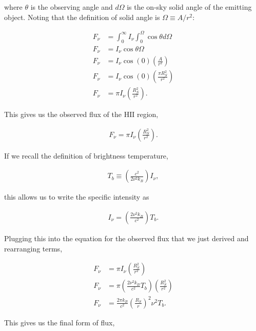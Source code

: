 \documentclass[12pt]{article}
\begin{document}
{\noindent}where $\theta$ is the observing angle and $d\Omega$ is the on-sky solid angle of the emitting object. Noting that the definition of solid angle is $\Omega \equiv A/r^2$:

\begin{equation*}
\begin{split}
    F_\nu &= \int_0^\infty I_\nu \int_0^\Omega \cos \theta d\Omega \\
    F_\nu &= I_\nu \cos \theta \Omega \\
    F_\nu &= I_\nu \cos(0) \left(\frac{A}{r^2}\right) \\
    F_\nu &= I_\nu \cos(0) \left(\frac{\pi R_S^2}{r^2}\right) \\
    F_\nu &= \pi I_\nu \left(\frac{R_S^2}{r^2}\right).
\end{split}
\end{equation*}

This gives us the observed flux of the $\mathrm{HII}$ region,

\begin{align*}
    \boxed{F_\nu = \pi I_\nu \left(\frac{R_S^2}{r^2}\right)}.
\end{align*}

If we recall the definition of brightness temperature,

\begin{align*}
    T_b \equiv \left(\frac{c^2}{2\nu^2k_B}\right)I_\nu,
\end{align*}

{\noindent}this allows us to write the specific intensity as

\begin{align*}
    I_\nu = \left(\frac{2\nu^2k_B}{c^2}\right)T_b.
\end{align*}

{\noindent}Plugging this into the equation for the observed flux that we just derived and rearranging terms,

\begin{equation*}
\begin{split}
    F_\nu &= \pi I_\nu \left(\frac{R_S^2}{r^2}\right) \\
    F_\nu &= \pi \left(\frac{2\nu^2k_B}{c^2}T_b\right) \left(\frac{R_S^2}{r^2}\right) \\
    F_\nu &= \frac{2\pi k_B}{c^2} \left(\frac{R_S}{r}\right)^2 \nu^2T_b.
\end{split}
\end{equation*}

This gives us the final form of flux,
\end{document}
